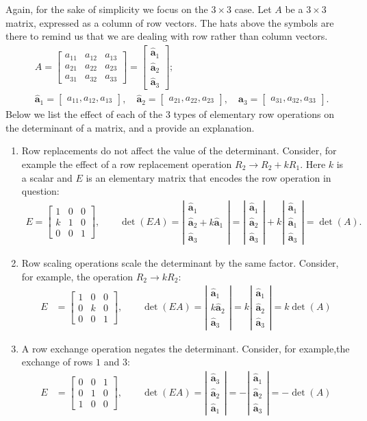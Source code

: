 \documentclass[12pt]{article}
\newcommand{\ha}{\hat{\ba}}
\newcommand{\ba}{\mathbf{a}}
\newcommand{\bmat}[1]{\begin{bmatrix}#1\end{bmatrix}}
\newcommand{\vmat}[1]{\left|\begin{matrix}#1\end{matrix}\right|}
\begin{document}
Again, for the sake of simplicity we focus on the $3\times 3$ case.
Let $A$ be a $3\times 3$ matrix, expressed as a column of row vectors.
The hats above the symbols are there to remind us that we are dealing
with row rather than column vectors.
\begin{align*}
  &A= \bmat{a_{11} & a_{12} & a_{13} \\
  a_{21} & a_{22} & a_{23} \\
  a_{31} & a_{32}&  a_{33}} = \bmat{ \ha_1\\ \ha_2\\ \ha_3};\\
  &\ha_1= \bmat{a_{11} , a_{12}, a_{13}},\quad \ha_2 =
  \bmat{a_{21} , a_{22},  a_{23}},\quad \ha_3 =
  \bmat{a_{31} , a_{32}, a_{33}}.
\end{align*}
Below we list the effect of each of the 3 types  of elementary row
operations on the determinant of a matrix, and a provide an explanation.
\begin{enumerate}
\item Row replacements do not affect the value
  of the determinant.  Consider, for example the effect of a row
  replacement operation $R_2 \to 
  R_2 + k R_1$. Here $k$ is a scalar and $E$ is an elementary matrix
  that encodes the row operation in question:
  \begin{align*}
    E=\bmat{1&0&0\\k&1&0\\0&0&1},\qquad
    \det( E A)= \vmat{\ha_1\\ \ha_2 + k \ha_1\\ \ha_3} =
    \vmat{\ha_1\\\ha_2\\ \ha_3} + k\vmat{\ha_1\\ \ha_1\\\ha_3} = \det(A).
  \end{align*}
\item Row scaling operations scale the determinant by the same
  factor.  Consider, for example, the operation $R_2\to k R_2$:
  \begin{align*}
    E&=\bmat{1&0&0\\0&k&0\\0&0&1}, \qquad \det( E A) = \vmat{\ha_1\\ k\ha_2\\
      \ha_3} = k\vmat{\ha_1\\\ha_2\\ \ha_3} = k\det(A)
  \end{align*}
\item A row exchange operation negates the determinant.  Consider, for
  example,the exchange of rows $1$ and $3$:
  \begin{align*}
    E&=\bmat{0&0&1\\0&1&0\\1&0&0}, \qquad \det( E A) = \vmat{\ha_3\\ \ha_2\\
      \ha_1} = -\vmat{\ha_1\\\ha_2\\ \ha_3} = -\det(A)
  \end{align*}
\end{enumerate}
\end{document}
